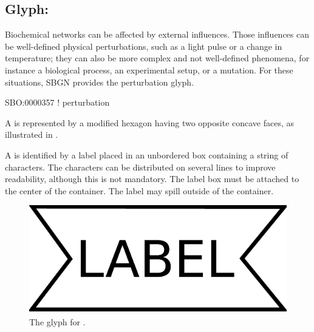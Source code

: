 \subsection{Glyph: }
\label{sec:perturbation}

Biochemical networks can be affected by external influences. Those influences can be well-defined physical perturbations, such as a light pulse or a change in temperature; they can also be more complex and not well-defined phenomena, for instance a biological process, an experimental setup, or a mutation. For these situations, SBGN provides the perturbation glyph.

\begin{glyphDescription}

\glyphSboTerm SBO:0000357 ! perturbation

\glyphContainer A  is represented by a modified hexagon
having two opposite concave faces, as illustrated in .

\glyphLabel A  is identified by a label placed in an
unbordered box containing a string of characters.  The characters can be
distributed on several lines to improve readability, although this is not
mandatory.  The label box must be attached to the center of the
 container.  The label may spill outside of the container.

\end{glyphDescription}

\begin{figure}[H]
  \centering
  \includegraphics[scale = 0.3]{images/perturbation}
  \caption{The \AF glyph for .}
  \label{fig:af:perturbation}
\end{figure}
